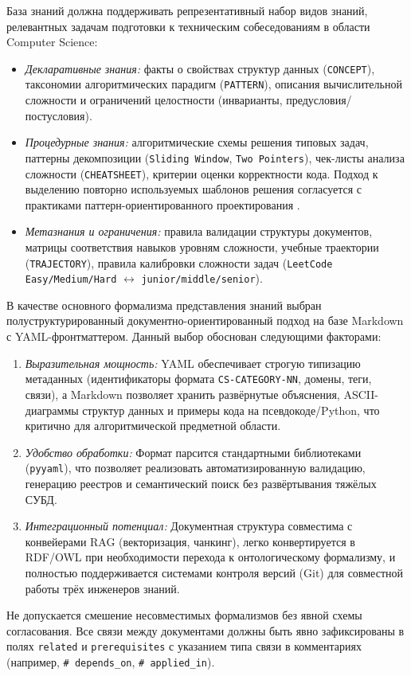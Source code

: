 База знаний должна поддерживать репрезентативный набор видов знаний, релевантных задачам подготовки к техническим собеседованиям в области Computer Science:
\begin{itemize}
    \item \textit{Декларативные знания:} факты о свойствах структур данных (\texttt{CONCEPT}), таксономии алгоритмических парадигм (\texttt{PATTERN}), описания вычислительной сложности и ограничений целостности (инварианты, предусловия/постусловия).
    \item \textit{Процедурные знания:} алгоритмические схемы решения типовых задач, паттерны декомпозиции (\texttt{Sliding Window}, \texttt{Two Pointers}), чек-листы анализа сложности (\texttt{CHEATSHEET}), критерии оценки корректности кода. Подход к выделению повторно используемых шаблонов решения согласуется с практиками паттерн-ориентированного проектирования \cite{Gamma2020}. 
    \item \textit{Метазнания и ограничения:} правила валидации структуры документов, матрицы соответствия навыков уровням сложности, учебные траектории (\texttt{TRAJECTORY}), правила калибровки сложности задач (\texttt{LeetCode Easy/Medium/Hard} $\leftrightarrow$ \texttt{junior/middle/senior}).
\end{itemize}\par

В качестве основного формализма представления знаний выбран полуструктурированный документно-ориентированный подход на базе Markdown с YAML-фронтматтером. Данный выбор обоснован следующими факторами:
\begin{enumerate}
    \item \textit{Выразительная мощность:} YAML обеспечивает строгую типизацию метаданных (идентификаторы формата \texttt{CS-CATEGORY-NN}, домены, теги, связи), а Markdown позволяет хранить развёрнутые объяснения, ASCII-диаграммы структур данных и примеры кода на псевдокоде/Python, что критично для алгоритмической предметной области.
    \item \textit{Удобство обработки:} Формат парсится стандартными библиотеками (\texttt{pyyaml}), что позволяет реализовать автоматизированную валидацию, генерацию реестров и семантический поиск без развёртывания тяжёлых СУБД.
    \item \textit{Интеграционный потенциал:} Документная структура совместима с конвейерами RAG (векторизация, чанкинг), легко конвертируется в RDF/OWL при необходимости перехода к онтологическому формализму, и полностью поддерживается системами контроля версий (Git) для совместной работы трёх инженеров знаний.
\end{enumerate}\par
Не допускается смешение несовместимых формализмов без явной схемы согласования. Все связи между документами должны быть явно зафиксированы в полях \texttt{related} и \texttt{prerequisites} с указанием типа связи в комментариях (например, \texttt{\# depends\_on}, \texttt{\# applied\_in}).

